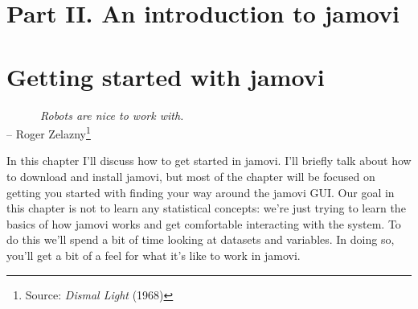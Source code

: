 \documentclass[
]{book}
\begin{document}
\hypertarget{part-ii.-an-introduction-to-jamovi}{%
\chapter*{Part II. An introduction to jamovi}\label{part-ii.-an-introduction-to-jamovi}}

\hypertarget{introj}{%
\chapter{Getting started with jamovi}\label{introj}}

~~~~~~\emph{Robots are nice to work with.}\\
\hspace*{0.333em}\hspace*{0.333em}\hspace*{0.333em}\hspace*{0.333em}\hspace*{0.333em}\hspace*{0.333em}\hspace*{0.333em}\hspace*{0.333em}\hspace*{0.333em}\hspace*{0.333em}\hspace*{0.333em}\hspace*{0.333em}\hspace*{0.333em}\hspace*{0.333em}\hspace*{0.333em}\hspace*{0.333em}\hspace*{0.333em}\hspace*{0.333em}\hspace*{0.333em}\hspace*{0.333em}\hspace*{0.333em}\hspace*{0.333em}\hspace*{0.333em}\hspace*{0.333em}\hspace*{0.333em}\hspace*{0.333em}\hspace*{0.333em}\hspace*{0.333em}\hspace*{0.333em}\hspace*{0.333em}-- Roger Zelazny\footnote{Source: \emph{Dismal Light} (1968)}

In this chapter I'll discuss how to get started in jamovi. I'll briefly talk about how to download and install jamovi, but most of the chapter will be focused on getting you started with finding your way around the jamovi GUI. Our goal in this chapter is not to learn any statistical concepts: we're just trying to learn the basics of how jamovi works and get comfortable interacting with the system. To do this we'll spend a bit of time looking at datasets and variables. In doing so, you'll get a bit of a feel for what it's like to work in jamovi.
\end{document}
